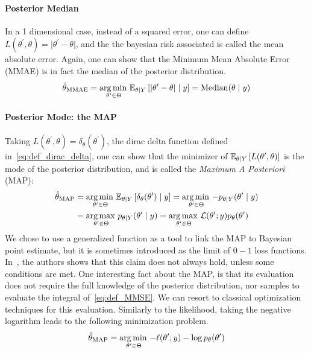 \documentclass[../../Main_ManuscritThese.tex]{subfiles}
\begin{document}
\paragraph{Posterior Median}
In a 1 dimensional case, instead of a squared error, one can define $L(\theta^{\prime}, \theta) = \lvert\theta^{\prime} - \theta\rvert$, and the the bayesian risk associated is called the mean absolute error. Again, one can show that the Minimum Mean Absolute Error (MMAE) is in fact the median of the posterior distribution.
\begin{equation}
  \label{eq:def_MMAE}
  \hat{\theta}_{\mathrm{MMAE}} = \operatorname*{arg\,min \,}_{\theta^{\prime}\in\Theta}\mathbb{E}_{\theta\mid Y}\left[\lvert \theta^{\prime} - \theta \rvert \mid y\right] = \mathop{\mathrm{Median}}(\theta \mid y)
\end{equation}

\paragraph{Posterior Mode: the MAP}
Taking $L(\theta^{\prime},\theta) = \delta_{\theta}(\theta^{\prime})$, the dirac delta function defined in~\cref{eq:def_dirac_delta}, one can show that the minimizer of $\mathbb{E}_{\theta\mid Y}\left[L(\theta^{\prime},\theta)\right]$ is the mode of the posterior distribution, and is called the \emph{Maximum A Posteriori} (MAP):
\begin{align}
  \label{eq:def_MAP}
  \hat{\theta}_{\mathrm{MAP}} &= \operatorname*{arg\,min \,}_{\theta^{\prime} \in \Theta}\mathbb{E}_{\theta\mid Y}\left[\delta_{\theta}(\theta^{\prime})\mid y\right] = \operatorname*{arg\,min \,}_{\theta^{\prime} \in \Theta} -p_{\theta\mid Y}(\theta^{\prime}\mid y) \\
                         &= \operatorname*{arg\,max \,}_{\theta^{\prime} \in \Theta} p_{\theta\mid Y}(\theta^{\prime} \mid y) = \operatorname*{arg\,max \,}_{\theta^{\prime} \in \Theta} \mathcal{L}(\theta^{\prime} ;y)p_{\theta}(\theta^{\prime})
                           \nonumber
\end{align}
We chose to use a generalized function as a tool to link the MAP to Bayesian point estimate, but it is sometimes introduced as the limit of $0-1$ loss functions. In~\cite{bassett_maximum_2019}, the authors shows that this claim does not always hold, unless some conditions are met.
One interesting fact about the MAP, is that its evaluation does not require the full knowledge of the posterior distribution, nor samples to evaluate the integral of~\cref{eq:def_MMSE}. We can resort to classical optimization techniques for this evaluation. Similarly to the likelihood, taking the negative logarithm leads to the following minimization problem.
\begin{equation}
  \label{eq:minimisation_MAP_log}
  \hat{\theta}_{\mathrm{MAP}} = \operatorname*{arg\,min \,}_{\theta^{\prime}\in \Theta} -\ell(\theta^{\prime};y) - \log p_{\theta}(\theta^{\prime})
\end{equation}
\end{document}
